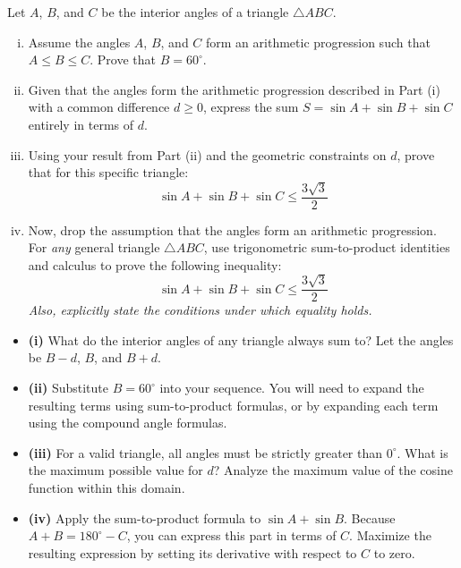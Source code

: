 \begin{problem}
Let $A$, $B$, and $C$ be the interior angles of a triangle $\triangle ABC$.

\begin{enumerate}[(i)]
  \item Assume the angles $A$, $B$, and $C$ form an arithmetic progression such that $A \le B \le C$. Prove that $B = 60^\circ$.
  \item Given that the angles form the arithmetic progression described in Part (i) with a common difference $d \ge 0$, express the sum $S = \sin A + \sin B + \sin C$ entirely in terms of $d$.
  \item Using your result from Part (ii) and the geometric constraints on $d$, prove that for this specific triangle:
  \[
  \sin A + \sin B + \sin C \le \frac{3\sqrt{3}}{2}
  \]
  \item Now, drop the assumption that the angles form an arithmetic progression. For \emph{any} general triangle $\triangle ABC$, use trigonometric sum-to-product identities and calculus to prove the following inequality:
  \[
  \sin A + \sin B + \sin C \le \frac{3\sqrt{3}}{2}
  \]
  \emph{Also, explicitly state the conditions under which equality holds.}
\end{enumerate}
\end{problem}

\begin{hintbox}
\begin{itemize}[leftmargin=*]
  \item \textbf{(i)} What do the interior angles of any triangle always sum to? Let the angles be $B-d$, $B$, and $B+d$.
  \item \textbf{(ii)} Substitute $B = 60^\circ$ into your sequence. You will need to expand the resulting terms using sum-to-product formulas, or by expanding each term using the compound angle formulas.
  \item \textbf{(iii)} For a valid triangle, all angles must be strictly greater than $0^\circ$. What is the maximum possible value for $d$? Analyze the maximum value of the cosine function within this domain.
  \item \textbf{(iv)} Apply the sum-to-product formula to $\sin A + \sin B$. Because $A+B = 180^\circ - C$, you can express this part in terms of $C$. Maximize the resulting expression by setting its derivative with respect to $C$ to zero.
\end{itemize}
\end{hintbox}

